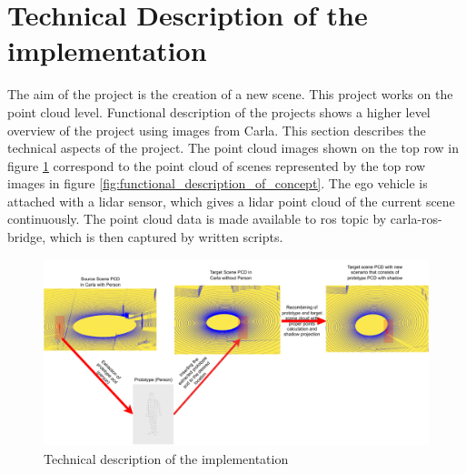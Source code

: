 \section{Technical Description of the implementation}
The aim of the project is the creation of a new scene. This project works on the point cloud level. Functional description of the projects shows a higher level overview of the project using images from Carla. This section describes the technical aspects of the project. The point cloud images shown on the top row in figure \ref{fig:technical_description_of_implementation} correspond to the point cloud of scenes represented by the top row images in figure \ref{fig:functional_description_of_concept}. The ego vehicle is attached with a lidar sensor, which gives a lidar point cloud of the current scene continuously. The point cloud data is made available to \acrfull{ros} topic by carla-ros-bridge, which is then captured by written scripts. 

\begin{figure}[htbp]
    \centering
    \includegraphics[width=1\linewidth]{97_graphics/concepts/technical_description_of_concept.pdf}
    \caption{Technical description of the implementation}
    \label{fig:technical_description_of_implementation}
\end{figure}

